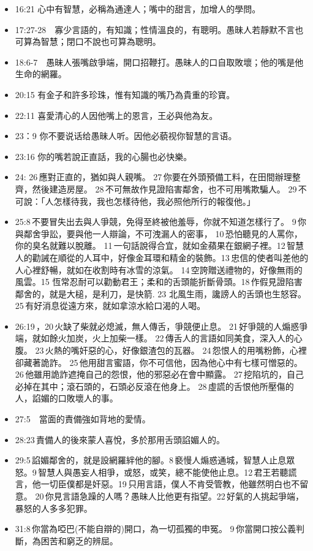 \begin{itemize}
\item 16:21 心中有智慧，必稱為通達人；嘴中的甜言，加增人的學問。
\item 17:27-28　寡少言語的，有知識；性情溫良的，有聰明。愚昧人若靜默不言也可算為智慧；閉口不說也可算為聰明。
\item 18:6-7　愚昧人張嘴啟爭端，開口招鞭打。愚昧人的口自取敗壞；他的嘴是他生命的網羅。
\item 20:15 有金子和許多珍珠，惟有知識的嘴乃為貴重的珍寶。
\item 22:11 喜愛清心的人因他嘴上的恩言，王必與他為友。
\item 23：9 你不要说话给愚昧人听。因他必藐视你智慧的言语。
\item 23:16 你的嘴若說正直話，我的心腸也必快樂。
\item 24: 26 應對正直的，猶如與人親嘴。 27 你要在外頭預備工料，在田間辦理整齊，然後建造房屋。 28 不可無故作見證陷害鄰舍，也不可用嘴欺騙人。 29 不可說：「人怎樣待我，我也怎樣待他，我必照他所行的報復他。」
\item 25:8 不要冒失出去與人爭競，免得至終被他羞辱，你就不知道怎樣行了。 9 你與鄰舍爭訟，要與他一人辯論，不可洩漏人的密事， 10 恐怕聽見的人罵你，你的臭名就難以脫離。 11 一句話說得合宜，就如金蘋果在銀網子裡。12 智慧人的勸誡在順從的人耳中，好像金耳環和精金的裝飾。13 忠信的使者叫差他的人心裡舒暢，就如在收割時有冰雪的涼氣。 14 空誇贈送禮物的，好像無雨的風雲。15 恆常忍耐可以勸動君王；柔和的舌頭能折斷骨頭。18 作假見證陷害鄰舍的，就是大槌，是利刀，是快箭. 23 北風生雨，讒謗人的舌頭也生怒容。25 有好消息從遠方來，就如拿涼水給口渴的人喝。
\item 26:19 ，20 火缺了柴就必熄滅，無人傳舌，爭競便止息。 21 好爭競的人煽惑爭端，就如餘火加炭，火上加柴一樣。 22 傳舌人的言語如同美食，深入人的心腹。 23 火熱的嘴奸惡的心，好像銀渣包的瓦器。 24 怨恨人的用嘴粉飾，心裡卻藏著詭詐。 25 他用甜言蜜語，你不可信他，因為他心中有七樣可憎惡的。 26 他雖用詭詐遮掩自己的怨恨，他的邪惡必在會中顯露。 27 挖陷坑的，自己必掉在其中；滾石頭的，石頭必反滾在他身上。 28 虛謊的舌恨他所壓傷的人，諂媚的口敗壞人的事。
\item 27:5　當面的責備強如背地的愛情。 
\item 28:23 責備人的後來蒙人喜悅，多於那用舌頭諂媚人的。
\item 29:5 諂媚鄰舍的，就是設網羅絆他的腳。8 褻慢人煽惑通城，智慧人止息眾怒。9 智慧人與愚妄人相爭，或怒，或笑，總不能使他止息。12 君王若聽謊言，他一切臣僕都是奸惡。19 只用言語，僕人不肯受管教，他雖然明白也不留意。 20 你見言語急躁的人嗎？愚昧人比他更有指望。22 好氣的人挑起爭端，暴怒的人多多犯罪。
\item 31:8 你當為啞巴(不能自辯的)開口，為一切孤獨的申冤。 9 你當開口按公義判斷，為困苦和窮乏的辨屈。
\end{itemize}

